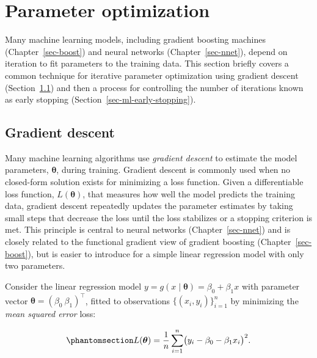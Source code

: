 \documentclass[
  letterpaper,
  krantz2]{style/krantz}
\begin{document}
\section{Parameter optimization}\label{parameter-optimization}

Many machine learning models, including gradient boosting
machines (Chapter~\ref{sec-boost}) and
neural networks (Chapter~\ref{sec-nnet}), depend
on iteration to fit parameters to the training data.
This section briefly covers a common technique for iterative parameter
optimization using gradient descent
(Section~\ref{sec-ml-gradient-descent}) and then a process for
controlling the number of iterations known as early stopping
(Section~\ref{sec-ml-early-stopping}).

\subsection{Gradient descent}\label{sec-ml-gradient-descent}

Many machine learning algorithms use \emph{gradient
descent} to estimate the model parameters,
\(\boldsymbol{\theta}\), during training. Gradient descent is commonly
used when no closed-form solution exists for minimizing a loss function.
Given a differentiable loss function, \(L(\boldsymbol{\theta})\), that
measures how well the model predicts the training data, gradient descent
repeatedly updates the parameter estimates by taking small steps that
decrease the loss until the loss stabilizes or a stopping criterion is
met. This principle is central to neural networks
(Chapter~\ref{sec-nnet}) and is closely related to the functional
gradient view of gradient boosting
(Chapter~\ref{sec-boost}), but is easier to introduce for a simple
linear regression model with only two
parameters.

Consider the linear regression model
\(y = g(x \mid \boldsymbol{\theta}) = \beta_0 + \beta_1 x\) with
parameter vector \(\boldsymbol{\theta}= (\beta_0 \ \beta_1)^\top\),
fitted to observations \(\{(x_i, y_i)\}^n_{i=1}\) by minimizing the
\emph{mean squared error} loss:

\begin{equation}\phantomsection\label{eq-ml-mse}{
L(\boldsymbol{\theta}) = \frac{1}{n}\sum_{i=1}^n \bigl(y_i - \beta_0 - \beta_1 x_i\bigr)^2.
}\end{equation}
\end{document}
